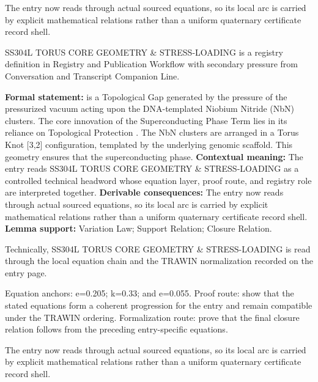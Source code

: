 The entry now reads through actual sourced equations, so its local arc is carried by explicit mathematical relations rather than a uniform quaternary certificate record shell.
\clearpage


\begingroup\small
{}
SS304L TORUS CORE GEOMETRY \& STRESS-LOADING is a registry definition in Registry and Publication Workflow with secondary pressure from Conversation and Transcript Companion Line.

\begingroup\footnotesize\setlength{\emergencystretch}{3em}\sloppy
\textbf{Formal statement:} is a Topological Gap generated by the pressure of the pressurized vacuum acting upon the DNA-templated Niobium Nitride (NbN) clusters. The core innovation of the Superconducting Phase Term lies in its reliance on Topological Protection . The NbN clusters are arranged in a Torus Knot [3,2] configuration, templated by the underlying genomic scaffold. This geometry ensures that the superconducting phase. \textbf{Contextual meaning:} The entry reads SS304L TORUS CORE GEOMETRY \& STRESS-LOADING as a controlled technical headword whose equation layer, proof route, and registry role are interpreted together. \textbf{Derivable consequences:} The entry now reads through actual sourced equations, so its local arc is carried by explicit mathematical relations rather than a uniform quaternary certificate record shell. \textbf{Lemma support:} Variation Law; Support Relation; Closure Relation.\par
\endgroup

Technically, SS304L TORUS CORE GEOMETRY \& STRESS-LOADING is read through the local equation chain and the TRAWIN normalization recorded on the entry page.

Equation anchors: e=0.205; k=0.33; and e=0.055. Proof route: show that the stated equations form a coherent progression for the entry and remain compatible under the TRAWIN ordering. Formalization route: prove that the final closure relation follows from the preceding entry-specific equations.

The entry now reads through actual sourced equations, so its local arc is carried by explicit mathematical relations rather than a uniform quaternary certificate record shell.
\endgroup

